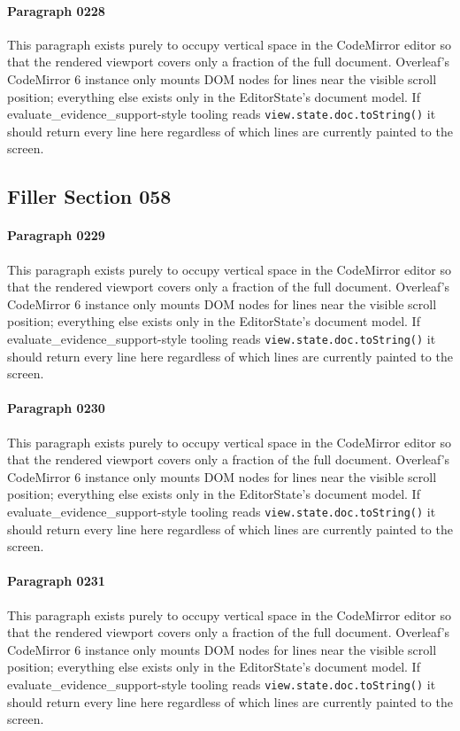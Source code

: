 \documentclass{article}
\begin{document}
\paragraph{Paragraph 0228}
This paragraph exists purely to occupy vertical space in the CodeMirror editor so that the rendered viewport covers only a fraction of the full document. Overleaf's CodeMirror 6 instance only mounts DOM nodes for lines near the visible scroll position; everything else exists only in the EditorState's document model. If evaluate\_evidence\_support-style tooling reads \texttt{view.state.doc.toString()} it should return every line here regardless of which lines are currently painted to the screen.

\subsection{Filler Section 058}
\paragraph{Paragraph 0229}
This paragraph exists purely to occupy vertical space in the CodeMirror editor so that the rendered viewport covers only a fraction of the full document. Overleaf's CodeMirror 6 instance only mounts DOM nodes for lines near the visible scroll position; everything else exists only in the EditorState's document model. If evaluate\_evidence\_support-style tooling reads \texttt{view.state.doc.toString()} it should return every line here regardless of which lines are currently painted to the screen.

\paragraph{Paragraph 0230}
This paragraph exists purely to occupy vertical space in the CodeMirror editor so that the rendered viewport covers only a fraction of the full document. Overleaf's CodeMirror 6 instance only mounts DOM nodes for lines near the visible scroll position; everything else exists only in the EditorState's document model. If evaluate\_evidence\_support-style tooling reads \texttt{view.state.doc.toString()} it should return every line here regardless of which lines are currently painted to the screen.

\paragraph{Paragraph 0231}
This paragraph exists purely to occupy vertical space in the CodeMirror editor so that the rendered viewport covers only a fraction of the full document. Overleaf's CodeMirror 6 instance only mounts DOM nodes for lines near the visible scroll position; everything else exists only in the EditorState's document model. If evaluate\_evidence\_support-style tooling reads \texttt{view.state.doc.toString()} it should return every line here regardless of which lines are currently painted to the screen.
\end{document}
